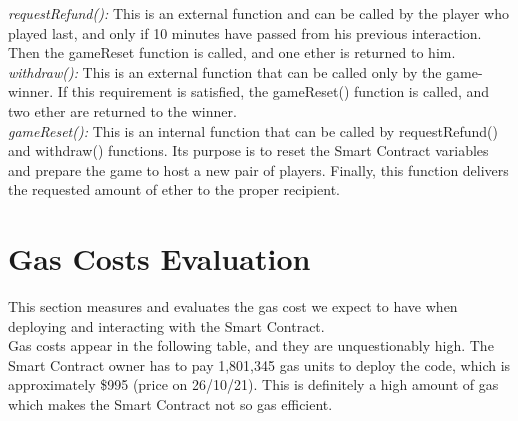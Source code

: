 \documentclass[12pt,a4paper]{article}
\begin{document}
\emph{requestRefund():} This is an external function and can be called by the player who played last, and only if 10 minutes
have passed from his previous interaction. Then the gameReset function is called, and one ether is returned to him.\\

\emph{withdraw():} This is an external function that can be called only by the game-winner. If this requirement is satisfied, the gameReset() function is called, and two ether are returned to the winner.\\

\emph{gameReset():} This is an internal function that can be called by requestRefund() and withdraw() functions. Its purpose is to reset the Smart Contract variables and prepare the game to host a new pair of players. Finally, this function delivers the requested amount of ether to the proper recipient.

\section*{Gas Costs Evaluation}
This section measures and evaluates the gas cost we expect to have when deploying and
interacting with the Smart Contract. \\

Gas costs appear in the following table, and they are unquestionably high.
The Smart Contract owner has to pay 1,801,345 gas units to deploy the code, which is
approximately \$995 (price on 26/10/21). This is definitely a high amount of gas which makes the
Smart Contract not so gas efficient. \\
\end{document}
